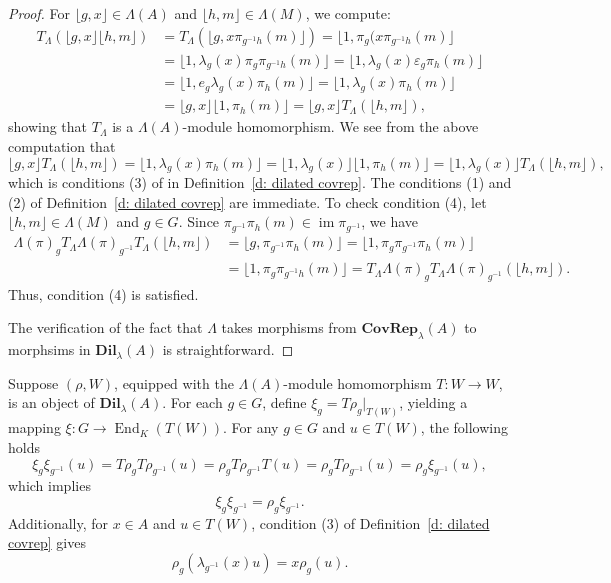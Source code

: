 \documentclass[11pt]{amsart}
\numberwithin{equation}{section}
\theoremstyle{definition}
\theoremstyle{remark}
\newcommand*{\im}{\operatorname{im}} %
\begin{document}
\begin{proof}
    For \(\lfloor g, x \rfloor \in \Lambda(A)\) and \(\lfloor h, m \rfloor \in \Lambda(M)\), we compute:
    \begin{align*}
        T_\Lambda(\lfloor g,x\rfloor\lfloor h,m\rfloor)
        &= T_\Lambda(\lfloor g,x\pi_{g^{-1}h}(m)\rfloor)
        = \lfloor 1,\pi_g(x\pi_{g^{-1}h}(m)\rfloor \\
        &= \lfloor 1,\lambda_g(x)\pi_g\pi_{g^{-1}h}(m)\rfloor
        =  \lfloor 1,\lambda_g(x)\varepsilon_g\pi_{h}(m)\rfloor \\
        &=  \lfloor 1,e_g\lambda_g(x)\pi_{h}(m)\rfloor
        = \lfloor 1,\lambda_g(x)\pi_{h}(m)\rfloor \\
        &= \lfloor g,x\rfloor\lfloor 1,\pi_h(m)\rfloor 
        = \lfloor g,x\rfloor T_\Lambda(\lfloor h,m\rfloor),
    \end{align*}
    showing that \( T_\Lambda \) is a \(\Lambda(A)\)-module homomorphism.  We see from the above computation that
 $$\lfloor g,x\rfloor T_\Lambda(\lfloor h,m\rfloor) =   \lfloor 1,\lambda_g(x)\pi_{h}(m)\rfloor 
        = \lfloor 1,\lambda_g(x) \rfloor \lfloor 1,  \pi_{h}(m)\rfloor 
        = \lfloor 1,\lambda_g(x) \rfloor T_\Lambda(\lfloor h,m\rfloor), $$ which is conditions (3) of in Definition~\ref{d: dilated covrep}.      The conditions (1) and (2) of Definition~\ref{d: dilated covrep} are immediate.
    To check condition (4), let \(\lfloor h, m \rfloor \in \Lambda(M)\) and \(g \in G\). Since \(\pi_{g^{-1}}\pi_h(m) \in \im \pi_{g^{-1}}\), we have
    \begin{align*}
        \Lambda(\pi)_gT_\Lambda\Lambda(\pi)_{g^{-1}} T_\Lambda(\lfloor h,m\rfloor)
        &= \lfloor g, \pi_{g^{-1}}\pi_h(m)\rfloor
        = \lfloor 1, \pi_g\pi_{g^{-1}}\pi_h(m)\rfloor \\
        &= \lfloor 1,\pi_g \pi_{g^{-1}h}(m)\rfloor
        = T_\Lambda\Lambda(\pi)_{g} T_\Lambda\Lambda(\pi)_{g^{-1}}(\lfloor h,m\rfloor).
    \end{align*}
    Thus, condition (4) is satisfied.
    
  The verification of the fact that $\Lambda $ takes morphisms  from \(\textbf{CovRep}_{\lambda} (A)\) to morphsims in  \(\textbf{Dil}_{\lambda}(A)\) is straightforward. 
\end{proof}

Suppose \((\rho, W)\), equipped with the \(\Lambda(A)\)-module homomorphism \(T: W \to W\), is an object of    \(\textbf{Dil}_{\lambda}(A)\).  For each \( g \in G \), define \(\xi_g = T\rho_g|_{T(W)}\), yielding a mapping \(\xi: G \to \operatorname{End}_K(T(W))\). For any \(g \in G\) and \(u \in T(W)\), the following holds
\[
    \xi_g \xi_{g^{-1}}(u) = T\rho_g T\rho_{g^{-1}}(u) = \rho_g T\rho_{g^{-1}} T(u) = \rho_g T\rho_{g^{-1}}(u) = \rho_g \xi_{g^{-1}}(u),
\]
which implies
\begin{equation}\label{eq xi}
    \xi_g \xi_{g^{-1}} = \rho_g \xi_{g^{-1}}.
\end{equation}
Additionally, for \(x \in A\)  and \(u \in T(W)\), condition (3) of Definition~\ref{d: dilated covrep} gives
\begin{equation}\label{eq relation rho}
    \rho_g(\lambda_{g^{-1}}(x)u) = x\rho_g(u).
\end{equation}
\end{document}
